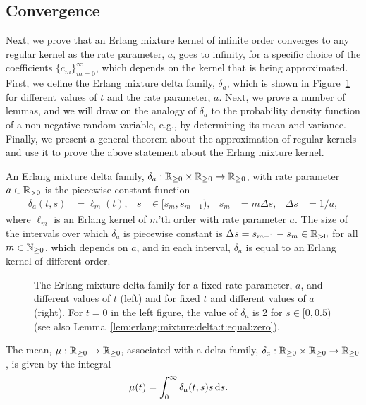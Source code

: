 \subsection{Convergence}\label{sec:convergence}
Next, we prove that an Erlang mixture kernel of infinite order converges to any regular kernel as the rate parameter, $a$, goes to infinity, for a specific choice of the coefficients $\{c_m\}_{m=0}^\infty$, which depends on the kernel that is being approximated. First, we define the Erlang mixture delta family, $\delta_a$, which is shown in Figure~\ref{fig:erlang:mixture:delta:family} for different values of $t$ and the rate parameter, $a$. Next, we prove a number of lemmas, and we will draw on the analogy of $\delta_a$ to the probability density function of a non-negative random variable, e.g., by determining its mean and variance. Finally, we present a general theorem about the approximation of regular kernels and use it to prove the above statement about the Erlang mixture kernel.
%
\begin{definition}\label{def:erlang:mixture:delta:family}
	An Erlang mixture delta family, $\delta_a: \mathbb{R}_{\geq 0} \times \mathbb{R}_{\geq 0} \rightarrow \mathbb{R}_{\geq 0}$, with rate parameter $a \in \mathbb{R}_{> 0}$ is the piecewise constant function
	\begin{align}\label{eq:erlang:mixture:delta:familiy}
		\delta_a(t, s) &= \ell_m(t), & s &\in[s_m, s_{m+1}), &
		s_m &= m \Delta s, &
		\Delta s &= 1/a,
	\end{align}
	where $\ell_m$ is an Erlang kernel of $m$'th order with rate parameter $a$. The size of the intervals over which $\delta_a$ is piecewise constant is $\Delta s = s_{m+1} - s_m \in \mathbb{R}_{> 0}$ for all $m \in \mathbb{N}_{\geq 0}$, which depends on $a$, and in each interval, $\delta_a$ is equal to an Erlang kernel of different order.
\end{definition}
%
\begin{figure}[t]
	\centering
	\caption{The Erlang mixture delta family for a fixed rate parameter, $a$, and different values of $t$ (left) and for fixed $t$ and different values of $a$ (right). For $t = 0$ in the left figure, the value of $\delta_a$ is 2 for $s \in [0, 0.5)$ (see also Lemma~\ref{lem:erlang:mixture:delta:t:equal:zero}).}
	\label{fig:erlang:mixture:delta:family}
\end{figure}
%
\begin{definition}
	The mean, $\mu: \mathbb{R}_{\geq 0} \rightarrow \mathbb{R}_{\geq 0}$, associated with a delta family, $\delta_a: \mathbb{R}_{\geq 0} \times \mathbb{R}_{\geq 0} \rightarrow \mathbb{R}_{\geq 0}$, is given by the integral
	\begin{align}\label{eq:definition:mean}
		\mu(t)
		&= \int_0^\infty \delta_a(t, s) s \,\mathrm{d} s.
	\end{align}
\end{definition}
